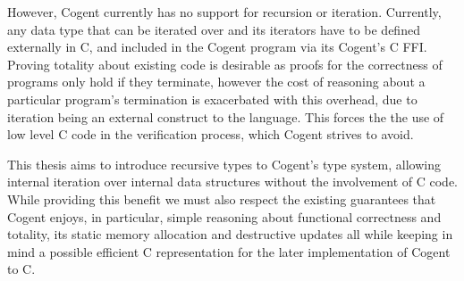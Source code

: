 However, Cogent currently has no support for recursion or iteration.
Currently, any data type that can be iterated over and its iterators have to be defined externally in C,
  and included in the Cogent program via its Cogent's C FFI.
Proving totality about existing code is desirable as proofs for the correctness of programs only hold
  if they terminate,
   however the cost of reasoning about a particular program's termination is
  exacerbated with this overhead, due to iteration being an external construct to the language.
This forces the the use of low level C code in the verification process, which Cogent strives to avoid.

This thesis aims to introduce recursive types to Cogent's type system, allowing internal iteration over
  internal data structures without the involvement of  C code.
While providing this benefit we must also respect the existing guarantees that Cogent enjoys,
  in particular, simple reasoning about functional correctness and  totality,
  its static memory allocation\liam{,} and destructive updates\liam{,} all while keeping in mind
  a possible efficient C representation for the later implementation of Cogent to C.
